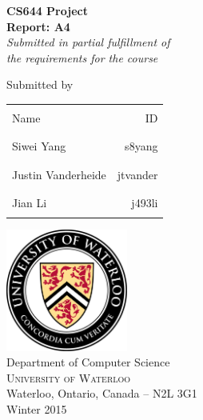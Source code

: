 \documentclass[12pt,letterpaper]{article}
\begin{document}
\begin{titlepage}
\begin{center}

\Large \textbf { {\bf CS644 Project} \\ Report: A4}\\[0.5in]

       \small \emph{Submitted in partial fulfillment of\\
        the requirements for the course}
        \vspace{.2in}

\normalsize Submitted by \\
\begin{table}[h]
\centering
\begin{tabular}{lr}\hline \\
Name & ID\\ \\ \hline
\\
Siwei Yang & s8yang \\ \\ \hline
\\
Justin Vanderheide & jtvander \\ \\ \hline
\\
Jian Li & j493li \\ \\ \hline
\end{tabular}
\end{table}

\vfill

\includegraphics[width=0.3\textwidth]{../res/UWLogo}\\[1.1in]
\Large{Department of Computer Science}\\
\normalsize
\textsc{University of Waterloo}\\
Waterloo, Ontario, Canada -- N2L 3G1 \\
\vspace{0.2cm}
Winter 2015

\end{center}
\end{titlepage}
\end{document}
